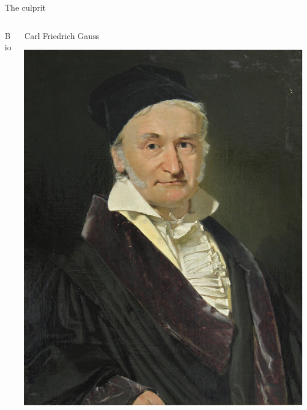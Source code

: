 \documentclass[australian,ignorenonframetext,aspectratio=169]{beamer}
\providecommand{\tightlist}{%
  \setlength{\itemsep}{0pt}\setlength{\parskip}{0pt}}
\begin{document}
\begin{frame}{The culprit}
\protect\hypertarget{the-culprit}{}

\begin{columns}[T]
\begin{column}{0.5\textwidth}
\begin{block}{Bio}


\end{block}
\end{column}

\begin{column}{0.5\textwidth}
\begin{block}{Carl Friedrich Gauss}

\includegraphics[width=1\linewidth]{../graphs/gauss}

\end{block}
\end{column}
\end{columns}

\end{frame}
\end{document}
